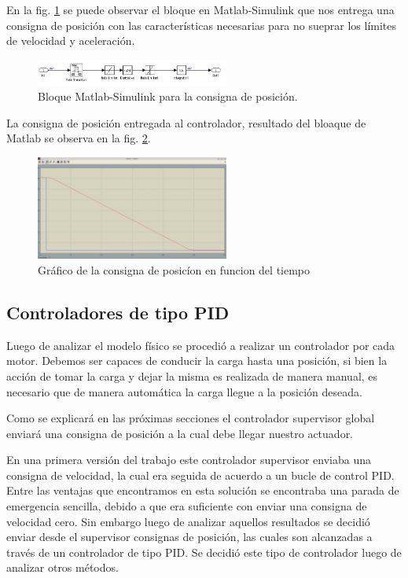 \documentclass[journal]{IEEEtran}
\begin{document}
En la fig. \ref{fig:bloque_consigna_pos} se puede observar el bloque en Matlab-Simulink
que nos entrega una consigna de posición con las características necesarias para no
sueprar los límites de velocidad y aceleración.

\begin{figure}[!t]
 \centering
  \includegraphics[width=2.5in]{bloque_consigna_posicion.jpeg}
  \caption{Bloque Matlab-Simulink para la consigna de posición.}
  \label{fig:bloque_consigna_pos} 
\end{figure}

La consigna de posición entregada al controlador, resultado del bloaque de Matlab 
se observa en la fig. \ref{fig:consigna_pos}.
\begin{figure}[!t]
 \centering
  \includegraphics[width=2.5in]{consigna_posicion.jpeg}
  \caption{Gráfico de la consigna de posicíon en funcion del tiempo}
  \label{fig:consigna_pos}
\end{figure}

\subsection{Controladores de tipo PID}
Luego de analizar el modelo físico se procedió a realizar un controlador por cada motor.
Debemos ser capaces de conducir la carga hasta una posición, si bien la acción de 
tomar la carga y dejar la misma es realizada de manera manual, es necesario que de manera
automática la carga llegue a la posición deseada. 

Como se explicará en las próximas secciones el controlador supervisor global enviará
una consigna de posición a la cual debe llegar nuestro actuador.

En una primera versión del trabajo este controlador supervisor enviaba una consigna de 
velocidad, la cual era seguida de acuerdo a un bucle de control PID. Entre las ventajas
que encontramos en esta solución se encontraba una parada de emergencia sencilla, debido
a que era suficiente con enviar una consigna de velocidad cero. Sin embargo luego
de analizar aquellos resultados se decidió enviar desde el supervisor consignas de 
posición, las cuales son alcanzadas a través de un controlador de tipo PID. 
Se decidió este tipo de controlador luego de analizar otros métodos.
\end{document}
